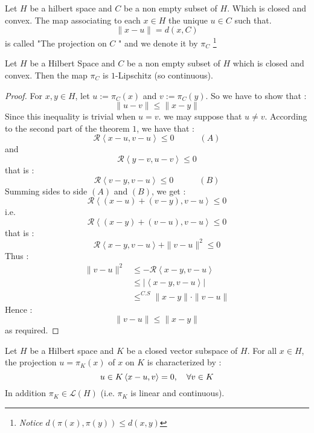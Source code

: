 \begin{definition}[]
Let $H $ be a hilbert space and 
$C $ be a non empty subset of $H$. 
Which is closed and convex. 
The map associating to each $x \in  H $
the unique $u \in  C $ such that. 
\[
\| x-u \| = d(x,C) 
\]
is called "The projection on $C $ " and we denote
it by $\pi _{C} $ \footnote {
  \it Notice $d(\pi (x) , \pi (y) ) 
  \leq d(x,y) $ }
\end{definition}
\begin{theorem}[]
Let $H $ be a Hilbert Space and 
$C $ be a non empty subset of $H $ 
which is closed and convex. Then the map
$\pi _{C} $ is $1 $-Lipschitz (so continuous).
\end{theorem}
\begin{proof}
For $x,y \in  H $, let $ u := 
\pi _{C}(x) $ and $v := \pi _{C}(y)  $. 
So we have to show that : 
\[
\| u-v \|  
\leq \| x-y \| 
\]
Since this inequality is trivial when $u=v $. 
we may suppose that $u \neq v $. According to the 
second part of the theorem $1 $, we have that : 
\[
\mathcal{R} \left\langle x-u, v-u \right\rangle  
\leq 0 \quad 
\quad 
\quad (A) 
\]
and 
\[
\mathcal{R} 
\left\langle 
  y-v, u-v
\right\rangle  
\leq 0
\]
that is : 
\[
\mathcal{R} 
\left\langle 
  v-y, v-u
\right\rangle  
\leq 0  \quad \quad \quad 
(B) 
\]
Summing sides to side $(A) $ and 
$(B)$, we get : 
\[
\mathcal{R}  
\left\langle 
  (x-u) + (v-y), 
  v-u
\right\rangle  
\leq 0
\]
i.e. 
\[
\mathcal{R} \left\langle 
  (x-y) + (v-u), v-u 
\right\rangle  \leq 0
\]
that is : 
\[
  \mathcal{R} 
  \left\langle 
    x-y, v-u
  \right\rangle  + 
  \| v-u \| ^2  \leq  0
\]
Thus : 
\begin{align*}
\| v-u \| ^2 
& \leq 
- \mathcal{R} \left\langle 
  x-y, v-u
\right\rangle  \\
& \leq 
\left| 
\left\langle x-y, v-u \right\rangle 
\right| \\
& \leq^{C.S} 
 \| x-y \| \cdot 
 \| v-u \| 
\end{align*}
Hence : 
\[
\| v-u \|  
\leq \| x - y \| 
\]
as required.
\end{proof}
\begin{corollary}[]
Let $H $ be a Hilbert space and $K $ be 
a closed vector subspace of $H $. For all 
$x \in  H$, the projection $u = \pi _{K}(x)  $   
of $x $ on $K $ is characterized by : 
\[
  u \in  K \\
  \left\langle 
    x-u, v
  \right\rangle=
   0 , \quad \forall  v \in  K
\]
In addition $\pi _{K} \in 
\mathcal{L} (H)$ (i.e. $\pi _{K} $ 
is linear and continuous).
\end{corollary}
